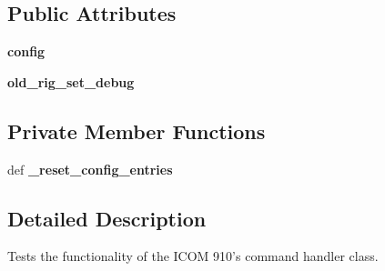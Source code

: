 \subsection*{Public Attributes}
\begin{DoxyCompactItemize}
\item 
\hypertarget{classhwm_1_1hardware_1_1devices_1_1drivers_1_1icom__910_1_1tests_1_1test__icom__910_1_1_test_i_c_o_m910_handler_ad08e398a5b7649ea33549913405393b2}{{\bfseries config}}\label{classhwm_1_1hardware_1_1devices_1_1drivers_1_1icom__910_1_1tests_1_1test__icom__910_1_1_test_i_c_o_m910_handler_ad08e398a5b7649ea33549913405393b2}

\item 
\hypertarget{classhwm_1_1hardware_1_1devices_1_1drivers_1_1icom__910_1_1tests_1_1test__icom__910_1_1_test_i_c_o_m910_handler_a4bc6aa722f57449041c74cfaea4f4059}{{\bfseries old\-\_\-rig\-\_\-set\-\_\-debug}}\label{classhwm_1_1hardware_1_1devices_1_1drivers_1_1icom__910_1_1tests_1_1test__icom__910_1_1_test_i_c_o_m910_handler_a4bc6aa722f57449041c74cfaea4f4059}

\end{DoxyCompactItemize}
\subsection*{Private Member Functions}
\begin{DoxyCompactItemize}
\item 
\hypertarget{classhwm_1_1hardware_1_1devices_1_1drivers_1_1icom__910_1_1tests_1_1test__icom__910_1_1_test_i_c_o_m910_handler_ad6aa6df245a4d944e386d9cb2275ebc2}{def {\bfseries \-\_\-reset\-\_\-config\-\_\-entries}}\label{classhwm_1_1hardware_1_1devices_1_1drivers_1_1icom__910_1_1tests_1_1test__icom__910_1_1_test_i_c_o_m910_handler_ad6aa6df245a4d944e386d9cb2275ebc2}

\end{DoxyCompactItemize}


\subsection{Detailed Description}
Tests the functionality of the I\-C\-O\-M 910's command handler class. 

